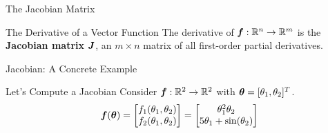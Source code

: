 \documentclass[handout]{beamer}
\begin{document}
\begin{frame}{The Jacobian Matrix}
\begin{definitionbox}{The Derivative of a Vector Function}
The derivative of $\bm{f}: \mathbb{R}^n \to \mathbb{R}^m$ is the \textbf{Jacobian matrix} $\bm{J}$, an $m \times n$ matrix of all first-order partial derivatives.
\end{definitionbox}
\end{frame}

\begin{frame}{Jacobian: A Concrete Example}
\begin{examplebox}{Let's Compute a Jacobian}
Consider $\bm{f}: \mathbb{R}^2 \to \mathbb{R}^2$ with $\bm{\theta} = [\theta_1, \theta_2]^T$.
$$
\bm{f}(\bm{\theta}) = \begin{bmatrix}
f_1(\theta_1, \theta_2) \\
f_2(\theta_1, \theta_2)
\end{bmatrix} =
\begin{bmatrix}
\theta_1^2 \theta_2 \\
5\theta_1 + \sin(\theta_2)
\end{bmatrix}
$$
\end{examplebox}
\end{frame}
\end{document}
